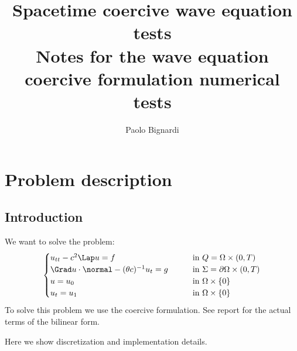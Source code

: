 \documentclass[]{report}
\title{%
    Spacetime coercive wave equation tests\\
    \large Notes for the wave equation coercive formulation 
    numerical tests}
\author{Paolo Bignardi}
\begin{document}
    \maketitle
    \chapter*{Problem description}
    \section*{Introduction}
    We want to solve the problem:
    \begin{equation}
        \begin{cases}
            u_{tt} - c^2 \Lap u = f \qquad &\text{in } Q = \Omega \times (0,T)\\
            \Grad u \cdot \normal - (\theta c)^{-1}u_t = g \qquad &\text{in } \Sigma = \partial \Omega \times (0,T) \\
            u = u_0  \qquad  & \text{in } \Omega \times \{0\} \\
            u_t = u_1 \qquad & \text{in } \Omega \times \{0\}
        \end{cases}
    \end{equation}
    To solve this problem we use the coercive formulation. See report for the actual terms of the bilinear form.

    Here we show discretization and implementation details.
\end{document}
